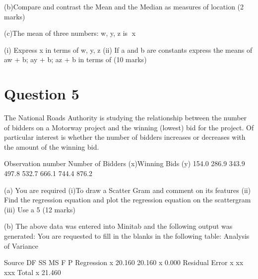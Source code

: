 			(b)Compare and contrast the Mean and the Median as measures of location
			(2 marks)
			
			(c)The mean of three numbers: w, y, z is x
			
			(i) Express x in terms of w, y, z
			(ii)  If a and b are constants express the means of 
			aw + b;   ay + b;   az + b
			in terms of  
			(10 marks)
			
			
			
			
			
	
			\section{Question 5} 
			
			The National Roads Authority is studying the relationship between the number of bidders on a Motorway project and the winning (lowest) bid for the project.  Of particular interest is whether the number of bidders increases or decreases with the amount of the winning bid.
			
			Observation number Number of Bidders (x)Winning Bids
			(y)
			154.0
			286.9
			343.9
			497.8
			532.7
			666.1
			744.4
			876.2
			
			
			
			(a) You are required 
			(i)To draw a Scatter Gram and comment on its features
			(ii) Find the regression equation and plot the regression equation on the scattergram
			(iii) Use a 5%
			(12 marks)
			
			
			(b) The above data was entered into Minitab and the following output was generated:
			You are requested to fill in the blanks in the following table:
			Analysis of Variance
			
			Source            DF          SS          MS         F        P
			Regression              x         20.160      20.160   x         0.000
			Residual Error         x        xx              xxx
			Total                     x         21.460
			
